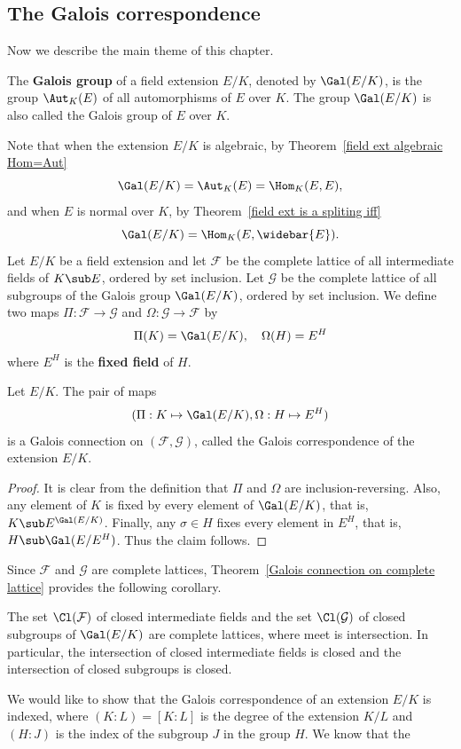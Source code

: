 \subsection{The Galois correspondence}
Now we describe the main theme of this chapter.
\begin{definition}
The \textbf{Galois group} of a field extension $E/K$, denoted by $\Gal(E/K)$, is the group $\Aut_K(E)$ of all automorphisms of $E$ over $K$. The group $\Gal(E/K)$ is also called the Galois group of $E$ over $K$.
\end{definition}
Note that when the extension $E/K$ is algebraic, by Theorem~\ref{field ext algebraic Hom=Aut}
\[\Gal(E/K)=\Aut_K(E)=\Hom_{K}(E,E),\]
and when $E$ is normal over $K$, by Theorem~\ref{field ext is a spliting iff}
\[\Gal(E/K)=\Hom_{K}(E,\widebar{E}).\]
Let $E/K$ be a field extension and let $\mathcal{F}$ be the complete lattice of all intermediate fields of $K\sub E$, ordered by set inclusion. Let $\mathcal{G}$ be the complete lattice of all subgroups of the Galois group $\Gal(E/K)$, ordered by set inclusion. We define two maps $\Pi:\mathcal{F}\to\mathcal{G}$ and $\Omega:\mathcal{G}\to\mathcal{F}$ by
\[\Pi(K)=\Gal(E/K),\quad \Omega(H)=E^H\]
where $E^H$ is the \textbf{fixed field} of $H$.
\begin{theorem}
Let $E/K$. The pair of maps
\[(\Pi:K\mapsto\Gal(E/K),\Omega:H\mapsto E^H)\]
is a Galois connection on $(\mathcal{F},\mathcal{G})$, called the Galois correspondence of the extension $E/K$.
\end{theorem}
\begin{proof}
It is clear from the definition that $\Pi$ and $\Omega$ are inclusion-reversing. Also, any element of $K$ is fixed by every element of $\Gal(E/K)$, that is, $K\sub E^{\Gal(E/K)}$. Finally, any $\sigma\in H$ fixes every element in $E^H$, that is, $H\sub\Gal(E/E^H)$. Thus the claim follows.
\end{proof}
Since $\mathcal{F}$ and $\mathcal{G}$ are complete lattices, Theorem~\ref{Galois connection on complete lattice} provides the following corollary.
\begin{corollary}
The set $\Cl(\mathcal{F})$ of closed intermediate fields and the set $\Cl(\mathcal{G})$ of closed subgroups of $\Gal(E/K)$ are complete lattices, where meet is intersection. In particular, the intersection of closed intermediate fields is closed and the intersection of closed subgroups is closed.
\end{corollary}
We would like to show that the Galois correspondence of an extension $E/K$ is indexed, where $(K:L)=[K:L]$ is the degree of the extension $K/L$ and $(H:J)$ is the index of the subgroup $J$ in the group $H$. We know that the
